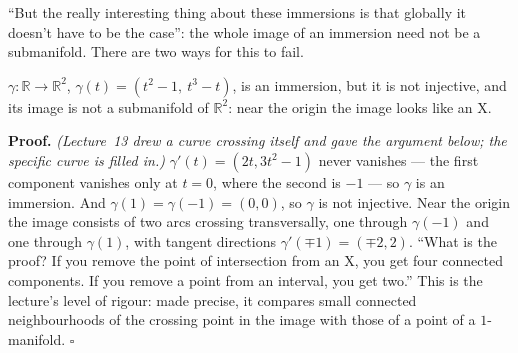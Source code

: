 \documentclass[11pt]{report}
\makeatletter
\newcounter{excounter}[section]
\renewenvironment{proof}[1][Proof]{\noindent\textbf{#1.} }{\hfill$\square$\par\vspace{5pt}}
\newcommand{\exlabel}[1]{\edef\@currentlabel{\arabic{section}.\arabic{excounter}}\label{#1}}
\makeatother
\begin{document}
``But the really interesting thing about these immersions is that globally it doesn't have to be the case'': the whole image of an immersion need not be a submanifold. There are two ways for this to fail.

\begin{exbox}\exlabel{ex:nodal-cubic}
$\gamma : \mathbb{R} \to \mathbb{R}^2$, $\gamma(t) = (t^2 - 1, \ t^3 - t)$, is an immersion, but it is not injective, and its image is not a submanifold of $\mathbb{R}^2$: near the origin the image looks like an X.
\end{exbox}

\begin{proof}
\textit{(Lecture~13 drew a curve crossing itself and gave the argument below; the specific curve is filled in.)} $\gamma'(t) = (2t, 3t^2 - 1)$ never vanishes --- the first component vanishes only at $t = 0$, where the second is $-1$ --- so $\gamma$ is an immersion. And $\gamma(1) = \gamma(-1) = (0, 0)$, so $\gamma$ is not injective. Near the origin the image consists of two arcs crossing transversally, one through $\gamma(-1)$ and one through $\gamma(1)$, with tangent directions $\gamma'(\mp 1) = (\mp 2, 2)$. ``What is the proof? If you remove the point of intersection from an X, you get four connected components. If you remove a point from an interval, you get two.'' This is the lecture's level of rigour: made precise, it compares small connected neighbourhoods of the crossing point in the image with those of a point of a $1$-manifold.
\end{proof}
\end{document}
